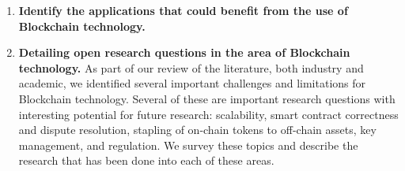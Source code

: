 \begin{enumerate}
	\item \textbf{Identify the applications that could benefit from the use of Blockchain technology.}
	
	\item \textbf{Detailing open research questions in the area of Blockchain technology.}
	As part of our review of the literature, both industry and academic, we identified several important challenges and limitations for Blockchain technology.
	Several of these are important research questions with interesting potential for future research: scalability, smart contract correctness and dispute resolution, stapling of on-chain tokens to off-chain assets, key management, and regulation.
	We survey these topics and describe the research that has been done into each of these areas.
	
\end{enumerate}
